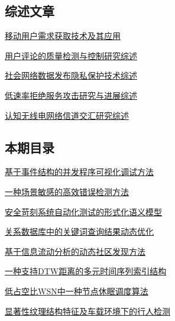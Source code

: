 \documentclass[a4paper]{article}
\begin{document}
\subsection{综述文章}
\href{http://www.jos.org.cn/ch/reader/download_pdf.aspx?file_no=4521&year_id=2014&quarter_id=3&falg=1}{移动用户需求获取技术及其应用}

\href{http://www.jos.org.cn/ch/reader/download_pdf.aspx?file_no=4517&year_id=2014&quarter_id=3&falg=1}{用户评论的质量检测与控制研究综述}

\href{http://www.jos.org.cn/ch/reader/download_pdf.aspx?file_no=4511&year_id=2014&quarter_id=3&falg=1}{社会网络数据发布隐私保护技术综述}

\href{http://www.jos.org.cn/ch/reader/download_pdf.aspx?file_no=4520&year_id=2014&quarter_id=3&falg=1}{低速率拒绝服务攻击研究与进展综述}

\href{http://www.jos.org.cn/ch/reader/download_pdf.aspx?file_no=4522&year_id=2014&quarter_id=3&falg=1}{认知无线电网络信道交汇研究综述}

\subsection{本期目录}
\href{http://www.jos.org.cn/ch/reader/download_pdf.aspx?file_no=4421&year_id=2014&quarter_id=3&falg=1}{基于事件结构的并发程序可视化调试方法}

\href{http://www.jos.org.cn/ch/reader/download_pdf.aspx?file_no=4419&year_id=2014&quarter_id=3&falg=1}{一种场景敏感的高效错误检测方法}

\href{http://www.jos.org.cn/ch/reader/download_pdf.aspx?file_no=4412&year_id=2014&quarter_id=3&falg=1}{安全苛刻系统自动化测试的形式化语义模型}

\href{http://www.jos.org.cn/ch/reader/download_pdf.aspx?file_no=4384&year_id=2014&quarter_id=3&falg=1}{关系数据库中的关键词查询结果动态优化}

\href{http://www.jos.org.cn/ch/reader/download_pdf.aspx?file_no=4462&year_id=2014&quarter_id=3&falg=1}{基于信息流动分析的动态社区发现方法}

\href{http://www.jos.org.cn/ch/reader/download_pdf.aspx?file_no=4410&year_id=2014&quarter_id=3&falg=1}{一种支持DTW距离的多元时间序列索引结构}

\href{http://www.jos.org.cn/ch/reader/download_pdf.aspx?file_no=4401&year_id=2014&quarter_id=3&falg=1}{低占空比WSN中一种节点休眠调度算法}

\href{http://www.jos.org.cn/ch/reader/download_pdf.aspx?file_no=4438&year_id=2014&quarter_id=3&falg=1}{显著性纹理结构特征及车载环境下的行人检测}
\end{document}
